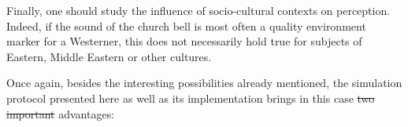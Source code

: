 \documentclass[12pt]{elsarticle}
\providecommand{\DIFadd}[1]{{\protect\color{blue}\uwave{#1}}} %
\providecommand{\DIFdel}[1]{{\protect\color{red}\sout{#1}}}                      %
\providecommand{\DIFaddbegin}{} %
\providecommand{\DIFaddend}{} %
\providecommand{\DIFdelbegin}{} %
\providecommand{\DIFdelend}{} %
\begin{document}

Finally, one should study the influence of socio-cultural contexts on perception. Indeed, if the sound of the church bell is most often a quality environment marker for a Westerner, this does not necessarily hold true for subjects of Eastern, Middle Eastern or other cultures.

\DIFaddbegin 

\DIFaddend 

Once again, besides the interesting possibilities already mentioned, the simulation protocol presented here as well as its implementation brings in this case \DIFdelbegin \DIFdel{two important }\DIFdelend \DIFaddbegin \DIFadd{three }\DIFaddend advantages:

\end{document}
